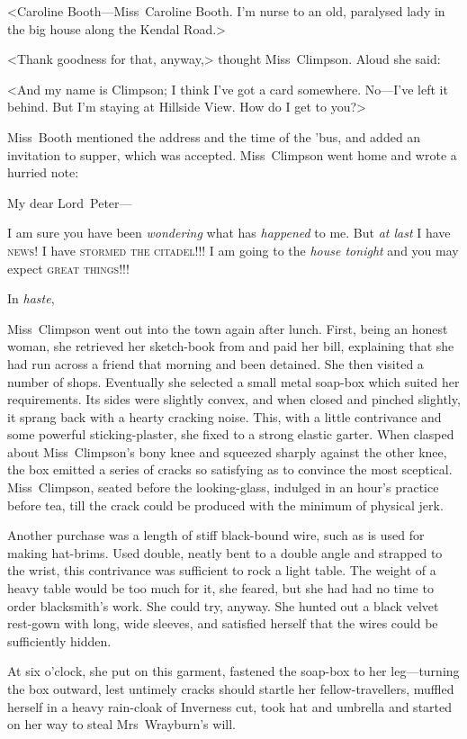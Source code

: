 <Caroline Booth—Miss~Caroline Booth. I'm nurse to an old, paralysed lady in the big house along the Kendal Road.>

<Thank goodness for that, anyway,> thought Miss~Climpson. Aloud she said:

<And my name is Climpson; I think I've got a card somewhere. No—I've left it behind. But I'm staying at Hillside View. How do I get to you?>

Miss~Booth mentioned the address and the time of the 'bus, and added an invitation to supper, which was accepted. Miss~Climpson went home and wrote a hurried note:

\begin{mail}{}{My dear Lord~Peter—}

I am sure you have been \emph{wondering} what has \emph{happened} to me. But \emph{at last} I have \textsc{news!} I have \textsc{stormed the citadel!!!} I am going to the \emph{house tonight} and you may expect \textsc{great things!!!}

In \emph{haste},

\end{mail}

Miss~Climpson went out into the town again after lunch. First, being an honest woman, she retrieved her sketch-book from  and paid her bill, explaining that she had run across a friend that morning and been detained. She then visited a number of shops. Eventually she selected a small metal soap-box which suited her requirements. Its sides were slightly convex, and when closed and pinched slightly, it sprang back with a hearty cracking noise. This, with a little contrivance and some powerful sticking-plaster, she fixed to a strong elastic garter. When clasped about Miss~Climpson's bony knee and squeezed sharply against the other knee, the box emitted a series of cracks so satisfying as to convince the most sceptical. Miss~Climpson, seated before the looking-glass, indulged in an hour's practice before tea, till the crack could be produced with the minimum of physical jerk.

Another purchase was a length of stiff black-bound wire, such as is used for making hat-brims. Used double, neatly bent to a double angle and strapped to the wrist, this contrivance was sufficient to rock a light table. The weight of a heavy table would be too much for it, she feared, but she had had no time to order blacksmith's work. She could try, anyway. She hunted out a black velvet rest-gown with long, wide sleeves, and satisfied herself that the wires could be sufficiently hidden.

At six o'clock, she put on this garment, fastened the soap-box to her leg—turning the box outward, lest untimely cracks should startle her fellow-travellers, muffled herself in a heavy rain-cloak of Inverness cut, took hat and umbrella and started on her way to steal Mrs~Wrayburn's will.